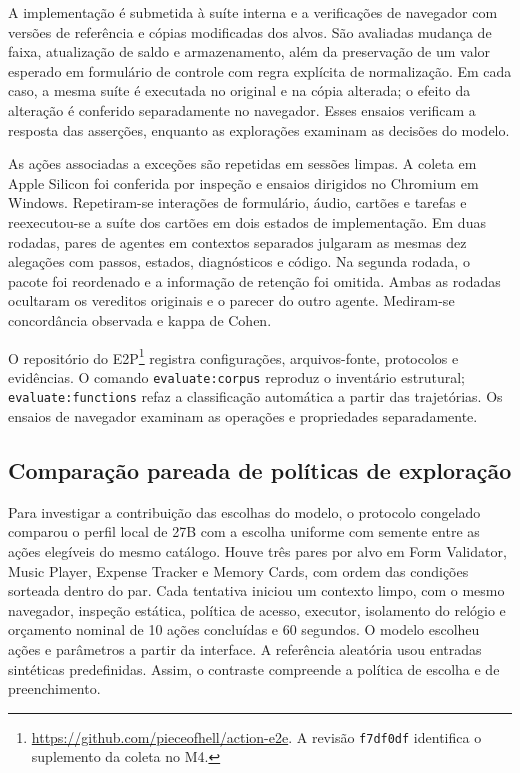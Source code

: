 \documentclass[12pt]{article}
\begin{document}
A implementação é submetida à suíte interna e a verificações de navegador com versões de referência e cópias modificadas dos alvos. São avaliadas mudança de faixa, atualização de saldo e armazenamento, além da preservação de um valor esperado em formulário de controle com regra explícita de normalização. Em cada caso, a mesma suíte é executada no original e na cópia alterada; o efeito da alteração é conferido separadamente no navegador. Esses ensaios verificam a resposta das asserções, enquanto as explorações examinam as decisões do modelo.

As ações associadas a exceções são repetidas em sessões limpas. A coleta em Apple Silicon foi conferida por inspeção e ensaios dirigidos no Chromium em Windows. Repetiram-se interações de formulário, áudio, cartões e tarefas e reexecutou-se a suíte dos cartões em dois estados de implementação. Em duas rodadas, pares de agentes em contextos separados julgaram as mesmas dez alegações com passos, estados, diagnósticos e código. Na segunda rodada, o pacote foi reordenado e a informação de retenção foi omitida. Ambas as rodadas ocultaram os vereditos originais e o parecer do outro agente. Mediram-se concordância observada e kappa de Cohen.

O repositório do E2P\footnote{\url{https://github.com/pieceofhell/action-e2e}. A revisão \texttt{f7df0df} identifica o suplemento da coleta no M4.} registra configurações, arquivos-fonte, protocolos e evidências. O comando \texttt{evaluate:corpus} reproduz o inventário estrutural; \texttt{evaluate:functions} refaz a classificação automática a partir das trajetórias. Os ensaios de navegador examinam as operações e propriedades separadamente.


\subsection{Comparação pareada de políticas de exploração}
Para investigar a contribuição das escolhas do modelo, o protocolo congelado comparou o perfil local de 27B com a escolha uniforme com semente entre as ações elegíveis do mesmo catálogo. Houve três pares por alvo em Form Validator, Music Player, Expense Tracker e Memory Cards, com ordem das condições sorteada dentro do par. Cada tentativa iniciou um contexto limpo, com o mesmo navegador, inspeção estática, política de acesso, executor, isolamento do relógio e orçamento nominal de 10 ações concluídas e 60 segundos. O modelo escolheu ações e parâmetros a partir da interface. A referência aleatória usou entradas sintéticas predefinidas. Assim, o contraste compreende a política de escolha e de preenchimento.
\end{document}
